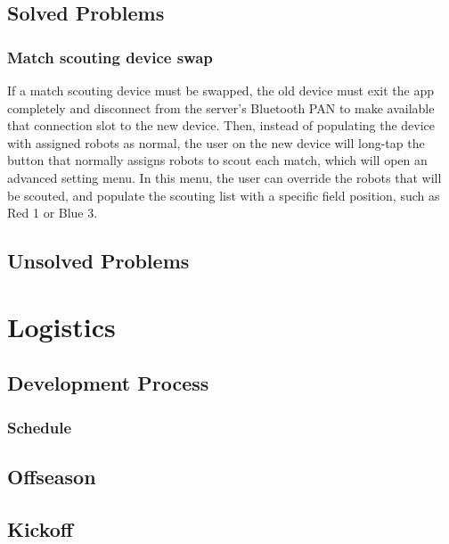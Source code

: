 \documentclass[11pt]{report}
\begin{document}

\section{Solved Problems}
\subsection{Match scouting device swap}
\label{sec:msdeviceswap}

If a match scouting device must be swapped, the old device must exit the app completely and disconnect from the server's Bluetooth PAN to make available that connection slot to the new device. Then, instead of populating the device with assigned robots as normal, the user on the new device will long-tap the button that normally assigns robots to scout each match, which will open an advanced setting menu. In this menu, the user can override the robots that will be scouted, and populate the scouting list with a specific field position, such as Red 1 or Blue 3.

\section{Unsolved Problems}


\chapter{Logistics}

\section{Development Process}
\subsection{Schedule}


\section{Offseason}
\section{Kickoff}
\end{document}

